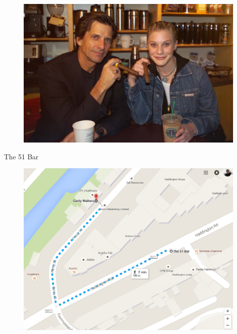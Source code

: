 \documentclass{beamer}
\begin{document}
	\begin{frame}
		
\begin{figure}
\centering
\includegraphics[width=1.1\linewidth]{starbucks}

\end{figure}

	\end{frame}

\begin{frame}
	\Large
	
	The 51 Bar
	
	\begin{figure}
\centering
\includegraphics[width=1.0\linewidth]{pubmap}
\end{figure}

\end{frame}
\end{document}
